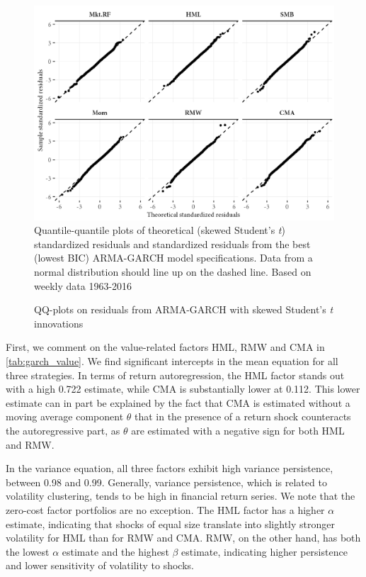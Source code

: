 \begin{figure}[H]
  \caption{QQ-plots on residuals from ARMA-GARCH with skewed Student's \textit{t} innovations}
  \label{fig:qq_ghst}
  \centering
  \begin{minipage}{\textwidth}
  \includegraphics[scale=1]{graphics/qq_ghst.png}  
  \vspace{3mm}
  \footnotesize
  Quantile-quantile plots of theoretical (skewed Student's \textit{t}) standardized residuals and standardized residuals from the best (lowest BIC) ARMA-GARCH model specifications. Data from a normal distribution should line up on the dashed line. Based on weekly data 1963-2016
  \end{minipage}
\end{figure}

First, we comment on the value-related factors HML, RMW and CMA in \autoref{tab:garch_value}. We find significant intercepts in the mean equation for all three strategies. In terms of return autoregression, the HML factor stands out with a high 0.722 estimate, while CMA is substantially lower at 0.112. This lower estimate can in part be explained by the fact that CMA is estimated without a moving average component $\theta$ that in the presence of a return shock counteracts the autoregressive part, as $\theta$ are estimated with a negative sign for both HML and RMW. 

In the variance equation, all three factors exhibit high variance persistence, between 0.98 and 0.99. Generally, variance persistence, which is related to volatility clustering, tends to be high in financial return series. We note that the zero-cost factor portfolios are no exception. The HML factor has a higher $\alpha$ estimate, indicating that shocks of equal size translate into slightly stronger volatility for HML than for RMW and CMA. RMW, on the other hand, has both the lowest $\alpha$ estimate and the highest $\beta$ estimate, indicating higher persistence and lower sensitivity of volatility to shocks.

